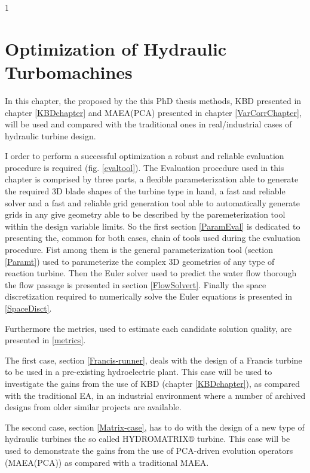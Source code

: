 1\ifpdf
    \graphicspath{{5/figures/PNG/}{5/figures/PDF/}{4/figures/}}
\else
    \graphicspath{{5/figures/EPS/}{5/figures/}}
\fi

\chapter{Optimization of Hydraulic Turbomachines} %
In this chapter, the proposed by the this PhD thesis methods, KBD presented in chapter \ref{KBDchapter} and MAEA(PCA) presented in chapter \ref{VarCorrChapter}, will be used and compared with the traditional ones in real/industrial cases of hydraulic turbine design. 

I order to perform a successful optimization a robust and reliable evaluation procedure is required (fig. \ref{evaltool}). The Evaluation procedure used in this chapter is comprised by three parts, a flexible parameterization able to generate the required 3D blade shapes of the turbine type in hand, a fast and reliable solver and a fast and reliable grid generation tool able to automatically generate grids in any give geometry able to be described by the paremeterization tool within the design variable limits. So the first section \ref{ParamEval} is dedicated to presenting the, common for both cases, chain of tools used during the evaluation procedure. Fist among them is the general parameterization tool (section \ref{Paramt}) used to parameterize the complex 3D geometries of any type of reaction turbine. Then the Euler solver used to predict the water flow thorough the flow passage is presented in section \ref{FlowSolvert}. Finally the space discretization required to numerically solve the Euler equations is presented in \ref{SpaceDisct}.        

Furthermore the metrics, used to estimate each candidate solution quality, are presented in \ref{metrics}. 

The first case, section \ref{Francis-runner},  deals with the design of a Francis turbine to be used in a pre-existing hydroelectric plant. This case will be used to investigate the gains from the use of KBD (chapter \ref{KBDchapter}), as compared with the traditional EA, in an industrial environment where a number of archived designs from older similar projects are available.

The second case, section \ref{Matrix-case}, has to do with the design of a new type of hydraulic turbines the so called HYDROMATRIX$\circledR$ turbine. This case will be used to demonstrate the gains from the use of PCA-driven evolution operators (MAEA(PCA)) as compared with a traditional MAEA.     

